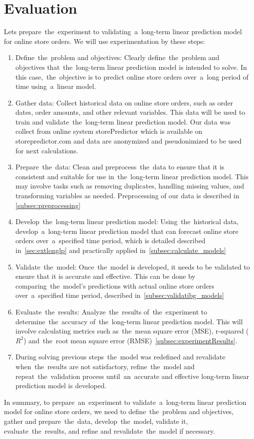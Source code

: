 
\chapter{Evaluation} \label{evaluation}
Lets prepare~the~experiment to validating~a~long-term linear prediction model for online store orders.
We will use experimentation by these steps:\\
\begin{enumerate}
    \item Define~the~problem and objectives: Clearly define~the~problem and objectives that~the~long-term linear
    prediction model is intended to solve. In this case,~the~objective is to predict online store orders over~a~long
    period of time using~a~linear model.
    \item Gather data: Collect historical data on online store orders, such as order dates, order amounts, and other
    relevant variables. This data will be used to train and validate~the~long-term linear prediction model.
    Our data was collect from online system storePredictor which is available on storepredictor.com and data are
    anonymized and pseudonimized to be used for next calculations.
    \item Prepare~the~data: Clean and preprocess~the~data to ensure that it is consistent and suitable for
    use in~the~long-term linear prediction model. This may involve tasks such as removing duplicates, handling missing
    values, and transforming variables as needed. Preprocessing of our data is described in \ref{subsec:preprocessing}
    \item Develop~the~long-term linear prediction model: Using~the~historical data, develop~a~long-term linear
    prediction model that can forecast online store orders over~a~specified time period, which is detailed
    described in~\ref{sec:extlonglp} and practically applied in~\ref{subsec:calculate_models}
    \item Validate~the~model: Once~the~model is developed, it needs to be validated to ensure that it is
    accurate and effective. This can be done by comparing~the~model's predictions with actual online store orders
    over~a~specified time period, described in~\ref{subsec:validatibg_models}
    \item Evaluate~the~results: Analyze~the~results of~the~experiment to determine~the~accuracy of~the~long-term
    linear prediction model. This will involve calculating metrics such as~the~mean square error (MSE),
    r-squared ($R^2$) and~the~root mean square error (RMSE)~\ref{subsec:experimentResults}.
    \item During solving previous steps~the~model was redefined and revalidate when~the~results are not satisfactory,
    refine~the~model and repeat~the~validation process until~an~accurate and effective long-term linear prediction
    model is developed.
\end{enumerate}
In summary, to prepare~an~experiment to validate~a~long-term linear prediction model for online store orders, we need to
define~the~problem and objectives, gather and prepare~the~data, develop~the~model, validate it, evaluate~the~results,
and refine and revalidate~the~model if necessary.
